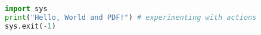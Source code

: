 \documentclass{article}
\begin{document}
\begin{lstlisting}[language=Python]
import sys
print("Hello, World and PDF!") # experimenting with actions
sys.exit(-1)
\end{lstlisting}
\end{document}
